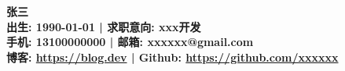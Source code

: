 \begin{center}
  \Huge\textbf{张三}\\[6mm]
  \normalsize\textbf{出生: 1990-01-01 | 求职意向: xxx开发}\\
  \normalsize\textbf{手机: 13100000000 | 邮箱: xxxxxx@gmail.com}\\
  \normalsize\textbf{博客: \href{https://blog.dev}{https://blog.dev} | Github: \href{https://github.com/xxxxxx}{https://github.com/xxxxxx}}\\[12mm]
\end{center}